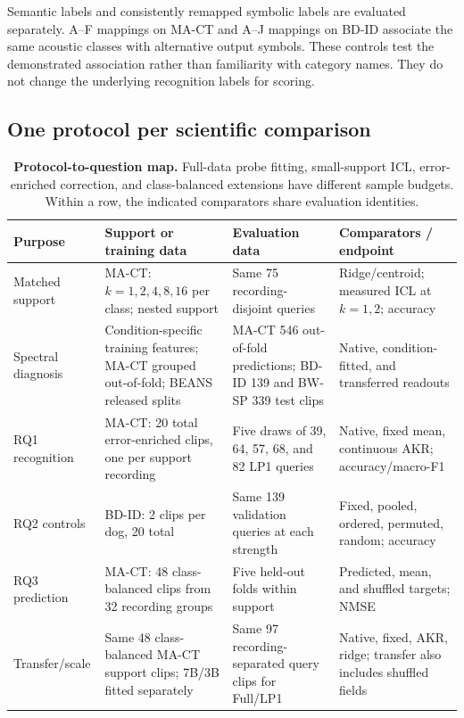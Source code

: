 \documentclass{article}
\begin{document}
Semantic labels and consistently remapped symbolic labels are evaluated separately. A--F mappings on MA-CT and A--J mappings on BD-ID associate the same acoustic classes with alternative output symbols. These controls test the demonstrated association rather than familiarity with category names. They do not change the underlying recognition labels for scoring.

\subsection{One protocol per scientific comparison}
\begin{table}[htbp]
\caption{\textbf{Protocol-to-question map.} Full-data probe fitting, small-support ICL, error-enriched correction, and class-balanced extensions have different sample budgets. Within a row, the indicated comparators share evaluation identities.}
\label{tab:protocol_map}
\centering\small
\begin{tabular}{@{}L{2.15cm}L{3.4cm}L{3.65cm}L{3.5cm}@{}}
\toprule
Purpose & Support or training data & Evaluation data & Comparators / endpoint \\
\midrule
Matched support & MA-CT: $k=1,2,4,8,16$ per class; nested support & Same 75 recording-disjoint queries & Ridge/centroid; measured ICL at $k=1,2$; accuracy \\
Spectral diagnosis & Condition-specific training features; MA-CT grouped out-of-fold; BEANS released splits & MA-CT 546 out-of-fold predictions; BD-ID 139 and BW-SP 339 test clips & Native, condition-fitted, and transferred readouts \\
RQ1 recognition & MA-CT: 20 total error-enriched clips, one per support recording & Five draws of 39, 64, 57, 68, and 82 LP1 queries & Native, fixed mean, continuous AKR; accuracy/macro-F1 \\
RQ2 controls & BD-ID: 2 clips per dog, 20 total & Same 139 validation queries at each strength & Fixed, pooled, ordered, permuted, random; accuracy \\
RQ3 prediction & MA-CT: 48 class-balanced clips from 32 recording groups & Five held-out folds within support & Predicted, mean, and shuffled targets; NMSE \\
Transfer/scale & Same 48 class-balanced MA-CT support clips; 7B/3B fitted separately & Same 97 recording-separated query clips for Full/LP1 & Native, fixed, AKR, ridge; transfer also includes shuffled fields \\
\bottomrule
\end{tabular}
\end{table}
\end{document}
